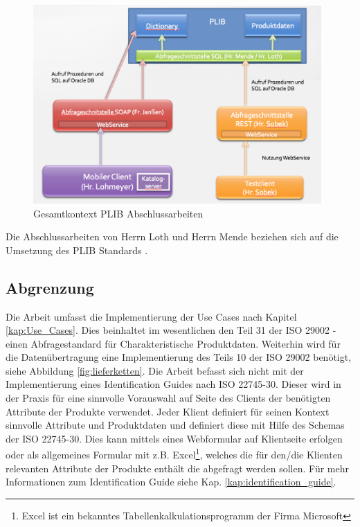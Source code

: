 \begin{figure}[htbp]
	\centering
		\includegraphics[width=0.98\textwidth]{images/gesamtkontext_plib.png}
	\caption{Gesamtkontext PLIB Abschlussarbeiten}
	\label{fig:gesamtkontext_plib}
\end{figure}

Die Abschlussarbeiten von Herrn Loth und Herrn Mende beziehen sich auf die Umsetzung des PLIB Standards  \citep[Vergl.][]{iso13584-42}.

\subsection{Abgrenzung}

Die Arbeit umfasst die Implementierung der Use Cases nach Kapitel \ref{kap:Use_Cases}. Dies beinhaltet im wesentlichen den Teil 31 der ISO 29002 - einen Abfragestandard für Charakteristische Produktdaten. 
Weiterhin wird für die Datenübertragung eine Implementierung des Teils 10 der ISO 29002 benötigt, siehe Abbildung \ref{fig:lieferketten}. 
Die Arbeit befasst sich nicht mit der Implementierung eines Identification Guides nach ISO 22745-30. Dieser wird in der Praxis für eine sinnvolle Vorauswahl auf Seite des Clients der benötigten Attribute der Produkte verwendet. Jeder Klient definiert für seinen Kontext sinnvolle Attribute und Produktdaten und definiert diese mit Hilfe des Schemas der ISO 22745-30. Dies kann mittels eines Webformular auf Klientseite erfolgen oder als allgemeines Formular mit z.B. Excel\footnote{Excel ist ein bekanntes Tabellenkalkulationsprogramm der Firma Microsoft}, welches die für den/die Klienten relevanten Attribute der Produkte enthält die abgefragt werden sollen. Für mehr Informationen zum Identification Guide siehe Kap. \ref{kap:identification_guide}.


